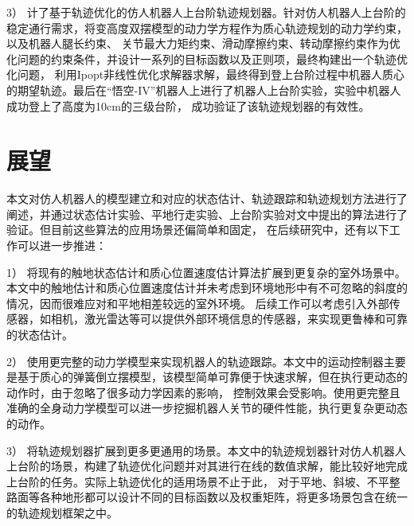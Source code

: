 3） 计了基于轨迹优化的仿人机器人上台阶轨迹规划器。针对仿人机器人上台阶的稳定通行需求，将变高度双摆模型的动力学方程作为质心轨迹规划的动力学约束，以及机器人腿长约束、
关节最大力矩约束、滑动摩擦约束、转动摩擦约束作为优化问题的约束条件，并设计一系列的目标函数以及正则项，最终构建出一个轨迹优化问题，
利用Ipopt非线性优化求解器求解，最终得到登上台阶过程中机器人质心的期望轨迹。最后在“悟空-IV”机器人上进行了机器人上台阶实验，实验中机器人成功登上了高度为10cm的三级台阶，
成功验证了该轨迹规划器的有效性。
\section{展望}
本文对仿人机器人的模型建立和对应的状态估计、轨迹跟踪和轨迹规划方法进行了阐述，并通过状态估计实验、平地行走实验、上台阶实验对文中提出的算法进行了验证。但目前这些算法的应用场景还偏简单和固定，
在后续研究中，还有以下工作可以进一步推进：

1） 将现有的触地状态估计和质心位置速度估计算法扩展到更复杂的室外场景中。本文中的触地估计和质心位置速度估计并未考虑到环境地形中有不可忽略的斜度的情况，因而很难应对和平地相差较远的室外环境。
后续工作可以考虑引入外部传感器，如相机，激光雷达等可以提供外部环境信息的传感器，来实现更鲁棒和可靠的状态估计。

2） 使用更完整的动力学模型来实现机器人的轨迹跟踪。本文中的运动控制器主要是基于质心的弹簧倒立摆模型，该模型简单可靠便于快速求解，但在执行更动态的动作时，由于忽略了很多动力学因素的影响，
控制效果会受影响。使用更完整且准确的全身动力学模型可以进一步挖掘机器人关节的硬件性能，执行更复杂更动态的动作。

3） 将轨迹规划器扩展到更多更通用的场景。本文中的轨迹规划器针对仿人机器人上台阶的场景，构建了轨迹优化问题并对其进行在线的数值求解，能比较好地完成上台阶的任务。实际上轨迹优化的适用场景不止于此，
对于平地、斜坡、不平整路面等各种地形都可以设计不同的目标函数以及权重矩阵，将更多场景包含在统一的轨迹规划框架之中。